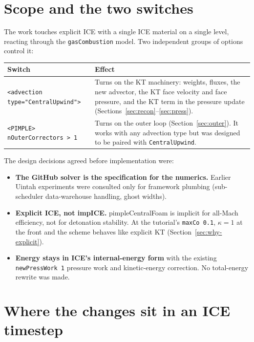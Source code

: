 \documentclass[11pt]{article}
\newcommand{\code}[1]{\texttt{\small #1}}
\begin{document}
\section{Scope and the two switches}

The work touches explicit ICE with a single ICE material on a single level, reacting
through the \code{gasCombustion} model. Two independent groups of options control it:

\begin{center}
\begin{tabularx}{\linewidth}{@{}l X@{}}
\toprule
\textbf{Switch} & \textbf{Effect} \\
\midrule
\code{<advection type="CentralUpwind">} &
  Turns on the KT machinery: weights, fluxes, the new advector, the KT face velocity and
  face pressure, and the KT term in the pressure update (Sections~\ref{sec:recon}--\ref{sec:press}). \\
\code{<PIMPLE> nOuterCorrectors > 1} &
  Turns on the outer loop (Section~\ref{sec:outer}). It works with any advection type but was
  designed to be paired with \code{CentralUpwind}. \\
\bottomrule
\end{tabularx}
\end{center}

\noindent
The design decisions agreed before implementation were:
\begin{itemize}
  \item \textbf{The GitHub solver is the specification for the numerics.} Earlier Uintah
        experiments were consulted only for framework plumbing (sub-scheduler data-warehouse
        handling, ghost widths).
  \item \textbf{Explicit ICE, not impICE.} pimpleCentralFoam is implicit for all-Mach
        efficiency, not for detonation stability. At the tutorial's \code{maxCo 0.1},
        $\kappa=1$ at the front and the scheme behaves like explicit KT
        (Section~\ref{sec:why-explicit}).
  \item \textbf{Energy stays in ICE's internal-energy form} with the existing
        \code{newPressWork 1} pressure work and kinetic-energy correction. No
        total-energy rewrite was made.
\end{itemize}

\section{Where the changes sit in an ICE timestep}
\end{document}
